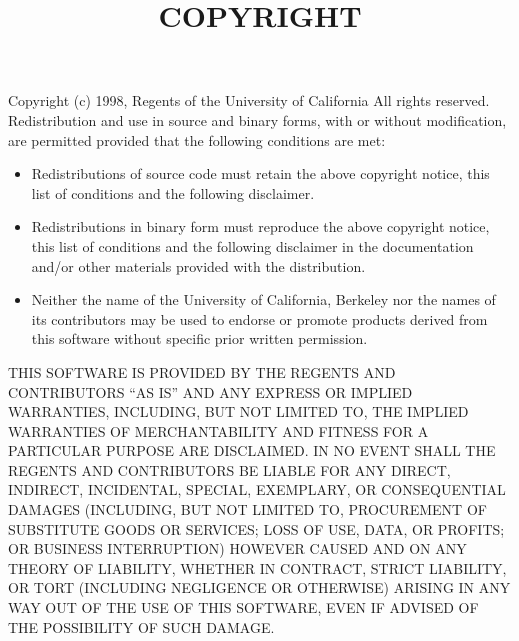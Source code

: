 \documentclass[a4paper, 12pt]{article}
\begin{document}
\title{COPYRIGHT}
\date{}

\maketitle

Copyright (c) 1998, Regents of the University of California
All rights reserved.
Redistribution and use in source and binary forms, with or without
modification, are permitted provided that the following conditions are met:

\begin{itemize}
\item Redistributions of source code must retain the above copyright
  notice, this list of conditions and the following disclaimer.
\item Redistributions in binary form must reproduce the above copyright
  notice, this list of conditions and the following disclaimer in the
  documentation and/or other materials provided with the distribution.
\item Neither the name of the University of California, Berkeley nor the
  names of its contributors may be used to endorse or promote products
  derived from this software without specific prior written permission.
\end{itemize}

THIS SOFTWARE IS PROVIDED BY THE REGENTS AND CONTRIBUTORS ``AS IS'' AND ANY
EXPRESS OR IMPLIED WARRANTIES, INCLUDING, BUT NOT LIMITED TO, THE IMPLIED
WARRANTIES OF MERCHANTABILITY AND FITNESS FOR A PARTICULAR PURPOSE ARE
DISCLAIMED. IN NO EVENT SHALL THE REGENTS AND CONTRIBUTORS BE LIABLE FOR ANY
DIRECT, INDIRECT, INCIDENTAL, SPECIAL, EXEMPLARY, OR CONSEQUENTIAL DAMAGES
(INCLUDING, BUT NOT LIMITED TO, PROCUREMENT OF SUBSTITUTE GOODS OR SERVICES;
LOSS OF USE, DATA, OR PROFITS; OR BUSINESS INTERRUPTION) HOWEVER CAUSED AND
ON ANY THEORY OF LIABILITY, WHETHER IN CONTRACT, STRICT LIABILITY, OR TORT
(INCLUDING NEGLIGENCE OR OTHERWISE) ARISING IN ANY WAY OUT OF THE USE OF THIS
SOFTWARE, EVEN IF ADVISED OF THE POSSIBILITY OF SUCH DAMAGE.
\end{document}
